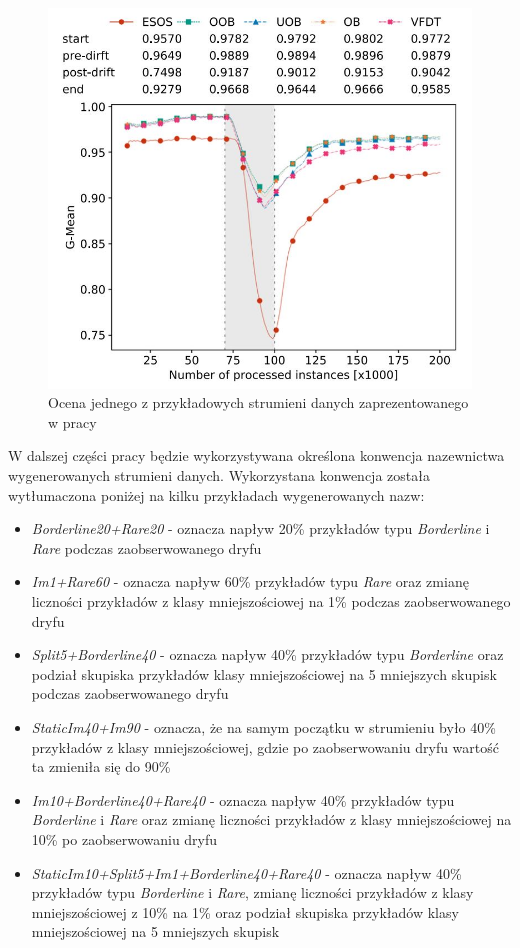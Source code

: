 \begin{figure}[h]
    \centering
    \includegraphics[width=13cm]{figures/drift_example.JPG}
    \caption{Ocena jednego z przykładowych strumieni danych zaprezentowanego w pracy \cite{Article:TypyPrzykladow}}\label{Figure:DriftExample}
\end{figure}

W dalszej części pracy będzie wykorzystywana określona konwencja nazewnictwa wygenerowanych strumieni danych. Wykorzystana konwencja została wytłumaczona poniżej na kilku przykładach wygenerowanych nazw:

\begin{itemize}
    \item \textit{Borderline20+Rare20} - oznacza napływ 20\% przykładów typu \textit{Borderline} i \textit{Rare} podczas zaobserwowanego dryfu
    \item \textit{Im1+Rare60} - oznacza napływ 60\% przykładów typu \textit{Rare} oraz zmianę liczności przykładów z klasy mniejszościowej na 1\% podczas zaobserwowanego dryfu
    \item \textit{Split5+Borderline40} - oznacza napływ 40\% przykładów typu \textit{Borderline} oraz podział skupiska przykładów klasy mniejszościowej na 5 mniejszych skupisk podczas zaobserwowanego dryfu
    \item \textit{StaticIm40+Im90} - oznacza, że na samym początku w strumieniu było 40\% przykładów z klasy mniejszościowej, gdzie po zaobserwowaniu dryfu wartość ta zmieniła się do 90\%
    \item \textit{Im10+Borderline40+Rare40} - oznacza napływ 40\% przykładów typu \textit{Borderline} i \textit{Rare} oraz zmianę liczności przykładów z klasy mniejszościowej na 10\% po zaobserwowaniu dryfu
    \item \textit{StaticIm10+Split5+Im1+Borderline40+Rare40} - oznacza napływ 40\% przykładów typu \textit{Borderline} i \textit{Rare}, zmianę liczności przykładów z klasy mniejszościowej z 10\% na 1\% oraz podział skupiska przykładów klasy mniejszościowej na 5 mniejszych skupisk
\end{itemize}